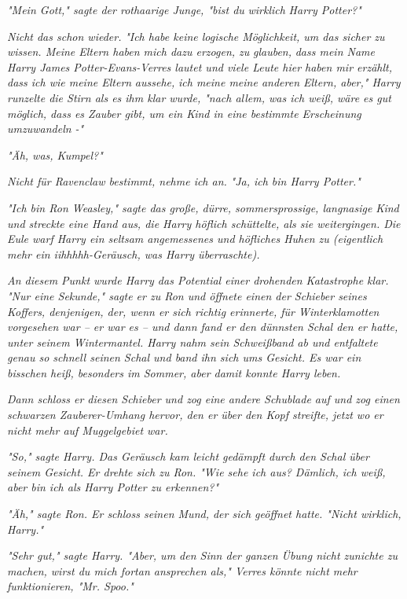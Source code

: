 {\emph{"Mein Gott," sagte der rothaarige Junge, "bist du} \emph{\emph{wirklich}} \emph{Harry Potter?"}

\emph{\emph{Nicht das schon wieder.}} \emph{"Ich habe keine logische Möglichkeit, um das sicher zu wissen. Meine Eltern haben mich dazu erzogen, zu} \emph{\emph{glauben,}} \emph{dass mein Name Harry James Potter-Evans-Verres lautet und viele Leute hier haben mir erzählt, dass ich wie meine Eltern} \emph{\emph{aussehe,}} \emph{ich meine meine anderen Eltern, aber," Harry runzelte die Stirn als es ihm klar wurde, "nach allem, was ich weiß, wäre es gut möglich, dass es Zauber gibt, um ein Kind in eine bestimmte Erscheinung umzuwandeln -"}

\emph{"Äh, was, Kumpel?"}

\emph{\emph{Nicht für Ravenclaw bestimmt, nehme ich an.}} \emph{"Ja, ich bin Harry Potter."}

\emph{"Ich bin Ron Weasley," sagte das große, dürre, sommersprossige, langnasige Kind und streckte eine Hand aus, die Harry höflich schüttelte, als sie weitergingen. Die Eule warf Harry ein seltsam angemessenes und höfliches Huhen zu (eigentlich mehr ein iihhhhh-Geräusch, was Harry überraschte).}

\emph{An diesem Punkt wurde Harry das Potential einer drohenden Katastrophe klar. "Nur eine Sekunde," sagte er zu Ron und öffnete einen der Schieber seines Koffers, denjenigen, der, wenn er sich richtig erinnerte, für Winterklamotten vorgesehen war -- er war es -- und dann fand er den dünnsten Schal den er hatte, unter seinem Wintermantel. Harry nahm sein Schweißband ab und entfaltete genau so schnell seinen Schal und band ihn sich ums Gesicht. Es war ein bisschen heiß, besonders im Sommer, aber damit konnte Harry leben.}

\emph{Dann schloss er diesen Schieber und zog eine andere Schublade auf und zog einen schwarzen Zauberer-Umhang hervor, den er über den Kopf streifte, jetzt wo er nicht mehr auf Muggelgebiet war.}

\emph{"So," sagte Harry. Das Geräusch kam leicht gedämpft durch den Schal über seinem Gesicht. Er drehte sich zu Ron. "Wie sehe ich aus? Dämlich, ich weiß, aber bin ich als Harry Potter zu erkennen?"}

\emph{"Äh," sagte Ron. Er schloss seinen Mund, der sich geöffnet hatte. "Nicht wirklich, Harry."}

\emph{"Sehr gut," sagte Harry. "Aber, um den Sinn der ganzen Übung nicht zunichte zu machen, wirst du mich fortan ansprechen als," Verres könnte nicht mehr funktionieren, "Mr. Spoo."}

}
